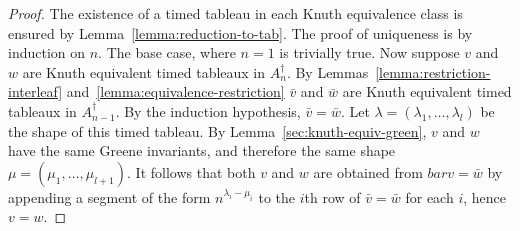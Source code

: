 \documentclass[10pt]{amsproc}
\theoremstyle{definition}
\theoremstyle{remark}
\begin{document}
\begin{proof}
  The existence of a timed tableau in each Knuth equivalence class is ensured by Lemma~\ref{lemma:reduction-to-tab}.
  The proof of uniqueness is by induction on $n$.
  The base case, where $n=1$ is trivially true.
  Now suppose $v$ and $w$ are Knuth equivalent timed tableaux in $A_n^\dagger$.
  By Lemmas~\ref{lemma:restriction-interleaf} and~\ref{lemma:equivalence-restriction} $\bar v$ and $\bar w$ are Knuth equivalent timed tableaux in $A_{n-1}^\dagger$.
  By the induction hypothesis, $\bar v=\bar w$.
  Let $\lambda=(\lambda_1,\dotsc,\lambda_l)$ be the shape of this timed tableau.
  By Lemma~\ref{sec:knuth-equiv-green}, $v$ and $w$ have the same Greene invariants, and therefore the same shape $\mu=(\mu_1,\dotsc,\mu_{l+1})$.
  It follows that both $v$ and $w$ are obtained from $bar v=\bar w$ by appending a segment of the form $n^{\lambda_i-\mu_i}$ to the $i$th row of $\bar v= \bar w$ for each $i$, hence $v=w$.
\end{proof}
\end{document}
